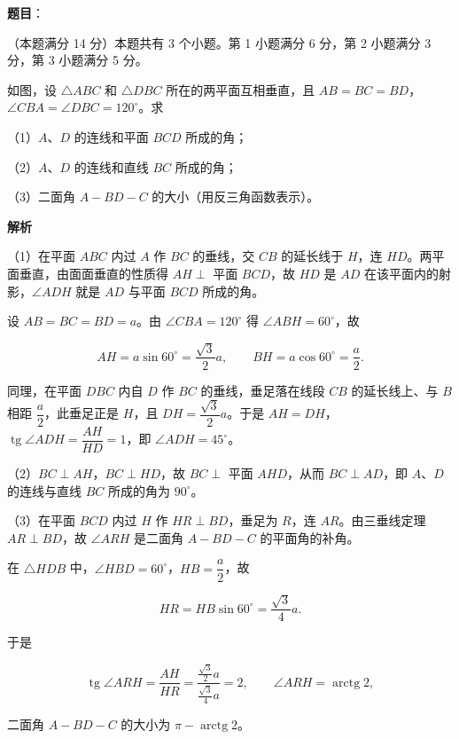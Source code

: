 \begin{answer}

\textbf{题目}：

（本题满分 14 分）本题共有 3 个小题。第 1 小题满分 6 分，第 2 小题满分 3 分，第 3 小题满分 5 分。

如图，设 $\triangle ABC$ 和 $\triangle DBC$ 所在的两平面互相垂直，且 $AB=BC=BD$，$\angle CBA=\angle DBC=120^{\circ}$。求

（1）$A$、$D$ 的连线和平面 $BCD$ 所成的角；

（2）$A$、$D$ 的连线和直线 $BC$ 所成的角；

（3）二面角 $A-BD-C$ 的大小（用反三角函数表示）。
\nopagebreak[4]
\begin{center}\end{center}
\nopagebreak[4]
\textbf{解析}

（1）在平面 $ABC$ 内过 $A$ 作 $BC$ 的垂线，交 $CB$ 的延长线于 $H$，连 $HD$。两平面垂直，由面面垂直的性质得 $AH\perp$ 平面 $BCD$，故 $HD$ 是 $AD$ 在该平面内的射影，$\angle ADH$ 就是 $AD$ 与平面 $BCD$ 所成的角。

设 $AB=BC=BD=a$。由 $\angle CBA=120^{\circ}$ 得 $\angle ABH=60^{\circ}$，故

\nopagebreak[4]
\[
AH=a\sin 60^{\circ}=\frac{\sqrt{3}}{2}a,\qquad BH=a\cos 60^{\circ}=\frac{a}{2}.
\]

同理，在平面 $DBC$ 内自 $D$ 作 $BC$ 的垂线，垂足落在线段 $CB$ 的延长线上、与 $B$ 相距 $\dfrac{a}{2}$，此垂足正是 $H$，且 $DH=\dfrac{\sqrt{3}}{2}a$。于是 $AH=DH$，$\operatorname{tg}\angle ADH=\dfrac{AH}{HD}=1$，即 $\angle ADH=45^{\circ}$。

（2）$BC\perp AH$，$BC\perp HD$，故 $BC\perp$ 平面 $AHD$，从而 $BC\perp AD$，即 $A$、$D$ 的连线与直线 $BC$ 所成的角为 $90^{\circ}$。

（3）在平面 $BCD$ 内过 $H$ 作 $HR\perp BD$，垂足为 $R$，连 $AR$。由三垂线定理 $AR\perp BD$，故 $\angle ARH$ 是二面角 $A-BD-C$ 的平面角的补角。

在 $\triangle HDB$ 中，$\angle HBD=60^{\circ}$，$HB=\dfrac{a}{2}$，故

\nopagebreak[4]
\[
HR=HB\sin 60^{\circ}=\frac{\sqrt{3}}{4}a.
\]

于是

\nopagebreak[4]
\[
\operatorname{tg}\angle ARH=\frac{AH}{HR}=\frac{\frac{\sqrt{3}}{2}a}{\frac{\sqrt{3}}{4}a}=2,
\qquad \angle ARH=\operatorname{arctg}2,
\]

二面角 $A-BD-C$ 的大小为 $\pi-\operatorname{arctg}2$。


\end{answer}
